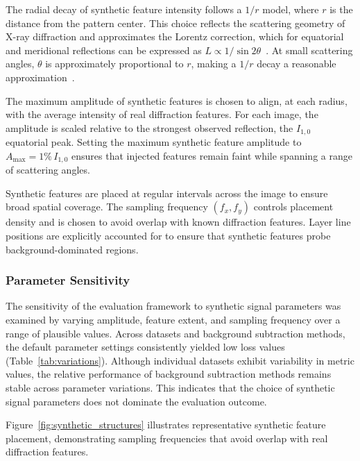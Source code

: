 \documentclass[iucr,review]{iucrjournals}
\begin{document}
The radial decay of synthetic feature intensity follows a $1/r$ model, where $r$ is the distance from the pattern center. This choice reflects the scattering geometry of X-ray diffraction and approximates the Lorentz correction, which for equatorial and meridional reflections can be expressed as $L \propto 1/\sin 2\theta$~\cite{Buerger1940}. At small scattering angles, $\theta$ is approximately proportional to $r$, making a $1/r$ decay a reasonable approximation~\cite{Denny1995}.

The maximum amplitude of synthetic features is chosen to align, at each radius, with the average intensity of real diffraction features. For each image, the amplitude is scaled relative to the strongest observed reflection, the $I_{1,0}$ equatorial peak. Setting the maximum synthetic feature amplitude to $A_{\mathrm{max}} = 1\%\, I_{1,0}$ ensures that injected features remain faint while spanning a range of scattering angles.

Synthetic features are placed at regular intervals across the image to ensure broad spatial coverage. The sampling frequency $(f_x, f_y)$ controls placement density and is chosen to avoid overlap with known diffraction features. Layer line positions are explicitly accounted for to ensure that synthetic features probe background-dominated regions.

\subsubsection{Parameter Sensitivity}

The sensitivity of the evaluation framework to synthetic signal parameters was examined by varying amplitude, feature extent, and sampling frequency over a range of plausible values. Across datasets and background subtraction methods, the default parameter settings consistently yielded low loss values (Table~\ref{tab:variations}). Although individual datasets exhibit variability in metric values, the relative performance of background subtraction methods remains stable across parameter variations. This indicates that the choice of synthetic signal parameters does not dominate the evaluation outcome.

Figure~\ref{fig:synthetic_structures} illustrates representative synthetic feature placement, demonstrating sampling frequencies that avoid overlap with real diffraction features.
\end{document}
